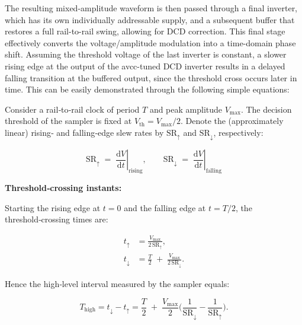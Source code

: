 The resulting mixed-amplitude waveform is then passed through a final inverter, which has its own individually addressable supply, and a subsequent buffer that restores a full rail-to-rail swing, allowing for DCD correction. This final stage effectively converts the voltage/amplitude modulation into a time-domain phase shift. Assuming the threshold voltage of the last inverter is constant, a slower rising edge at the output of the avcc-tuned DCD inverter results in a delayed falling transition at the buffered output, since the threshold cross occurs later in time.
This can be easily demonstrated through the following simple equations:

Consider a rail‑to‑rail clock of period \(T\) and peak amplitude
\(V_{\max}\).  The decision threshold of the sampler is fixed at
\(V_{\text{th}} = V_{\max}/2\).
Denote the (approximately linear) rising‑ and falling‑edge slew
rates by \(\text{SR}_{\uparrow}\) and \(\text{SR}_{\downarrow}\), respectively:

\begin{equation}
\text{SR}_{\uparrow} \;=\;
\left.\frac{\mathrm{d}V}{\mathrm{d}t}\right|_{\text{rising}},
\qquad
\text{SR}_{\downarrow} \;=\;
\left.\frac{\mathrm{d}V}{\mathrm{d}t}\right|_{\text{falling}}
\label{eq:slew_def}
\end{equation}

\textbf{Threshold‑crossing instants:}

Starting the rising edge at \(t=0\) and the falling edge at
\(t = T/2\), the threshold‑crossing times are:

\begin{subequations}\label{eq:t_cross}
\begin{align}
t_{\uparrow}   &= \frac{V_{\max}}{2\,\text{SR}_{\uparrow}},
\label{eq:t_up} \\[2pt]
t_{\downarrow} &= \frac{T}{2} \;+\;
                 \frac{V_{\max}}{2\,\text{SR}_{\downarrow}}.
\label{eq:t_down}
\end{align}
\end{subequations}

Hence the high‑level interval measured by the sampler equals:

\begin{equation}
T_{\text{high}}
    = t_{\downarrow} - t_{\uparrow}
    = \frac{T}{2} \;+\;
      \frac{V_{\max}}{2}
      \biggl(
         \frac{1}{\text{SR}_{\downarrow}}
        -\frac{1}{\text{SR}_{\uparrow}}
      \biggr).
\end{equation}

